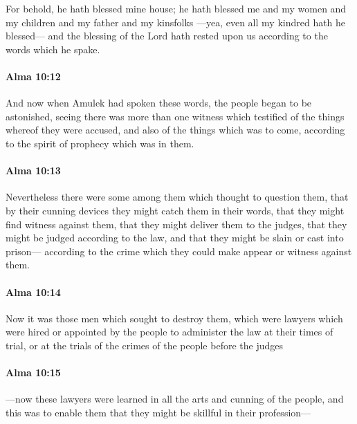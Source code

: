 			For behold, he hath blessed mine house;
			he hath blessed me and my women and my children
			and my father and my kinsfolks
			---yea, even all my kindred hath he blessed---
			and the blessing of the Lord hath rested upon us
			according to the words which he spake.

		\paragraph{Alma 10:12} %
			\label{ALMA-10-12}

			And now when Amulek had spoken these words,
			the people began to be astonished,
			seeing there was more than one witness
			which testified of the things whereof they were accused,
			and also of the things which was to come,
			according to the spirit of prophecy which was in them.

		\paragraph{Alma 10:13} %
			\label{ALMA-10-13}

			Nevertheless there were some among them which thought to question them,
			that by their cunning devices they might catch them in their words,
			that they might find witness against them,
			that they might deliver them to the judges,
			that they might be judged according to the law,
			and that they might be slain or cast into prison---
			according to the crime which they could make appear or witness against them.

		\paragraph{Alma 10:14} %
			\label{ALMA-10-14}

			Now it was those men which sought to destroy them,
			which were lawyers which were hired or appointed by the people
			to administer the law at their times of trial,
			or at the trials of the crimes of the people before the judges

		\paragraph{Alma 10:15} %
			\label{ALMA-10-15}

			---now these lawyers were learned in all the arts and cunning of the people,
			and this was to enable them that they might be skillful in their profession---

